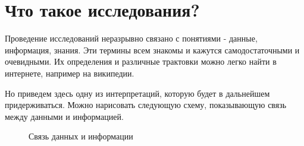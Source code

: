 \section{Что такое исследования?}

Проведение исследований неразрывно связано с понятиями - данные, информация, знания. Эти термины всем знакомы и кажутся самодостаточными и очевидными. Их определения и различные трактовки можно легко найти в интернете, например на википедии.




Но приведем здесь одну из интерпретаций, которую будет в дальнейшем придерживаться. Можно нарисовать следующую схему, показывающую связь между данными и информацией.  

\begin{figure}[h!]
	\begin{center}
		
		\caption{Связь данных и информации}
		\label{ris:data_info_chart_1}
	\end{center}
\end{figure}

